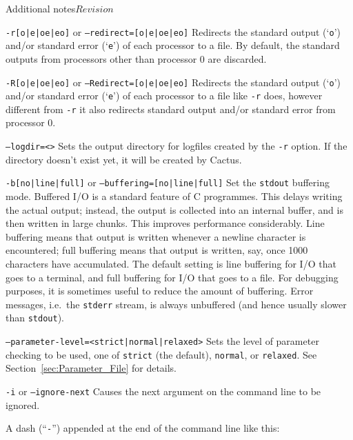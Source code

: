 \begin{cactuspart}{Additional notes}{}{$Revision$}
\begin{Lentry}
\item [\texttt{-r[o|e|oe|eo]} or \texttt{--redirect=[o|e|oe|eo]}]
Redirects the standard output (`\texttt{o}') and/or standard error
(`\texttt{e}') of each processor to a file.  By default,
the standard outputs from processors other than processor 0 are discarded.

\item [\texttt{-R[o|e|oe|eo]} or \texttt{--Redirect=[o|e|oe|eo]}]
Redirects the standard output (`\texttt{o}') and/or standard error
(`\texttt{e}') of each processor to a file like \texttt{-r} does, however
different from \texttt{-r} it also redirects standard output and/or
standard error from processor 0.

\item [\texttt{--logdir=<\var{directory}>}]
Sets the output directory for logfiles created by the \texttt{-r} option.
If the directory doesn't exist yet, it will be created by Cactus.

\item [\texttt{-b[no|line|full]} or \texttt{--buffering=[no|line|full]}]
  Set the \texttt{stdout} buffering mode.  Buffered I/O is a
  standard feature of C programmes.  This delays writing the actual
  output; instead, the output is collected into an internal buffer,
  and is then written in large chunks.  This improves performance
  considerably.  Line buffering means that output is written whenever
  a newline character is encountered; full buffering means that output
  is written, say, once 1000 characters have accumulated.  The default
  setting is line buffering for I/O that goes to a terminal, and full
  buffering for I/O that goes to a file.  For debugging purposes, it
  is sometimes useful to reduce the amount of buffering.  Error
  messages, i.e.\ the \texttt{stderr} stream, is always unbuffered
  (and hence usually slower than \texttt{stdout}).

\item [\texttt{--parameter-level=<strict|normal|relaxed>}]
Sets the level of parameter checking to be used, one of \texttt{strict}
(the default), \texttt{normal}, or \texttt{relaxed}.
See Section~\ref{sec:Parameter_File} for details.

\item [\texttt{-i} or \texttt{--ignore-next}]
Causes the next argument on the command line to be ignored.
\end{Lentry}

A dash (``\texttt{-}'') appended at the end of the command line like this:


\end{cactuspart}
